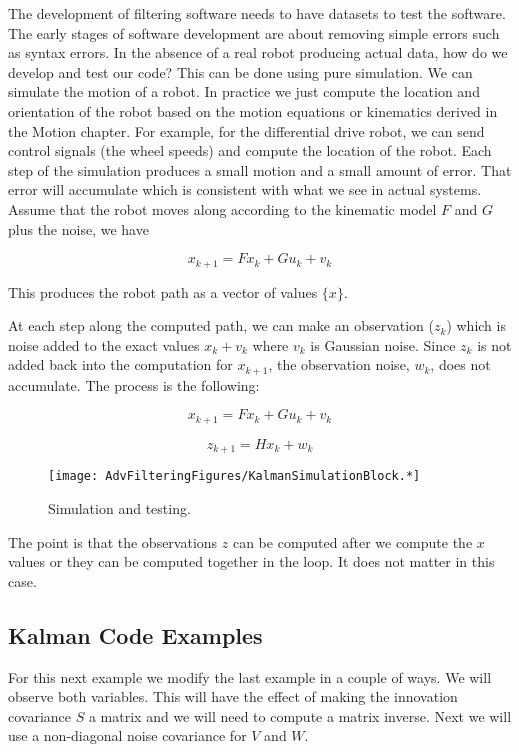 The development of filtering software needs to have datasets to test the
software. The early stages of software development are about removing
simple errors such as syntax errors. In the absence of a real robot
producing actual data, how do we develop and test our code? This can be
done using pure simulation. We can simulate the motion of a robot. In
practice we just compute the location and orientation of the robot based
on the motion equations or kinematics derived in the Motion chapter. For
example, for the differential drive robot, we can send control signals
(the wheel speeds) and compute the location of the robot. Each step of
the simulation produces a small motion and a small amount of error. That
error will accumulate which is consistent with what we see in actual
systems. Assume that the robot moves along according to the kinematic
model \(F\) and \(G\) plus the noise, we have

\[x_{k+1} = Fx_k + Gu_k + v_k\]

This produces the robot path as a vector of values \(\{ x \}\).

At each step along the computed path, we can make an observation
(\(z_k\)) which is noise added to the exact values \(x_k + v_k\) where
\(v_k\) is Gaussian noise. Since \(z_k\) is not added back into the
computation for \(x_{k+1}\), the observation noise, \(w_k\), does not
accumulate. The process is the following:

\[x_{k+1} = Fx_k + Gu_k + v_k\]

\[z_{k+1} = Hx_k + w_k\]

\begin{figure}
\centering
\texttt{[image: AdvFilteringFigures/KalmanSimulationBlock.*]}
\caption{Simulation and testing.}
\end{figure}

The point is that the observations \(z\) can be computed after we
compute the \(x\) values or they can be computed together in the loop.
It does not matter in this case.

\hypertarget{kalman-code-examples}{%
\subsection{Kalman Code Examples}\label{kalman-code-examples}}

For this next example we modify the last example in a couple of ways. We
will observe both variables. This will have the effect of making the
innovation covariance \(S\) a matrix and we will need to compute a
matrix inverse. Next we will use a non-diagonal noise covariance for
\(V\) and \(W\).

